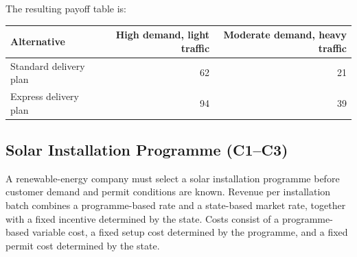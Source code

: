The resulting payoff table is:

\begin{center}
	\begin{tabular}{lrr}
		\toprule
		Alternative
		& High demand, light traffic
		& Moderate demand, heavy traffic \\
		\midrule
		Standard delivery plan & 62 & 21 \\
		Express delivery plan & 94 & 39 \\
		\bottomrule
	\end{tabular}
\end{center}


\subsection{Solar Installation Programme (C1--C3)}
\label{sec:problem16-solar-installation-programme-c1-c3}

A renewable-energy company must select a solar installation programme before
customer demand and permit conditions are known. Revenue per installation
batch combines a programme-based rate and a state-based market rate, together
with a fixed incentive determined by the state. Costs consist of a
programme-based variable cost, a fixed setup cost determined by the programme,
and a fixed permit cost determined by the state.

